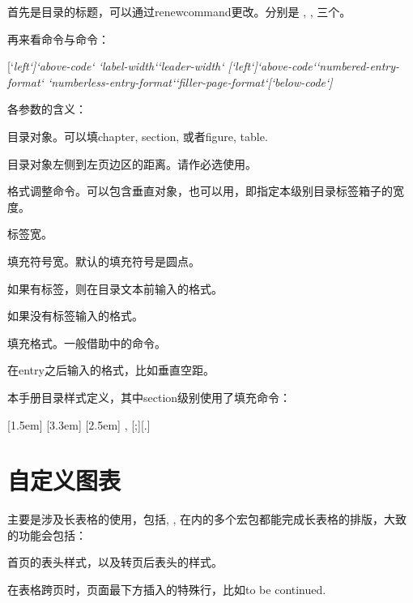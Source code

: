 首先是目录的标题，可以通过renewcommand更改。分别是 , , 三个。

再来看命令与命令：
\begin{latex}
[`\itshape left`]{`\itshape above-code`}
    {`\itshape label-width`}{`\itshape leader-width`}
[`\itshape left`]{`\itshape above-code`}{`\itshape numbered-entry-format`}
    {`\itshape numberless-entry-format`}{`\itshape filler-page-format`}[`\itshape below-code`]
\end{latex}

各参数的含义：
\begin{para}
\item[section:] 目录对象。可以填chapter, section, 或者figure, table.
\item[left:] 目录对象左侧到左页边区的距离。请作必选使用。
\item[above-code:] 格式调整命令。可以包含垂直对象，也可以用，即指定本级别目录标签箱子的宽度。
\item[label-width:] 标签宽。
\item[leader-width:] 填充符号宽。默认的填充符号是圆点。
\item[numered-entry-format:] 如果有标签，则在目录文本前输入的格式。
\item[numberless-entry-format:] 如果没有标签输入的格式。
\item[filler-page-format:] 填充格式。一般借助中的命令。
\item[below-code:] 在entry之后输入的格式，比如垂直空距。
\end{para}

本手册目录样式定义，其中section级别使用了填充命令：
\begin{latex}
[1.5em]{}{\contentslabel{1.5em}}
    {\hspace*{-2em}}{\hfill\contentspage}
[3.3em]{}
    {\contentslabel{1.8em}}{\hspace*{-2.3em}}
    {\titlerule*[8pt]{$\cdot$}\contentspage}
[2.5em]{\small}
    {\thecontentslabel{}}{}
    {, \thecontentspage}[;\qquad][.]
\end{latex}

\section{自定义图表}
\label{sec:figtab}
主要是涉及长表格的使用，包括, , 在内的多个宏包都能完成长表格的排版，大致的功能会包括：
\begin{para}
\item[表头控制：] 首页的表头样式，以及转页后表头的样式。
\item[转页样式：] 在表格跨页时，页面最下方插入的特殊行，比如to be continued.
\end{para}

